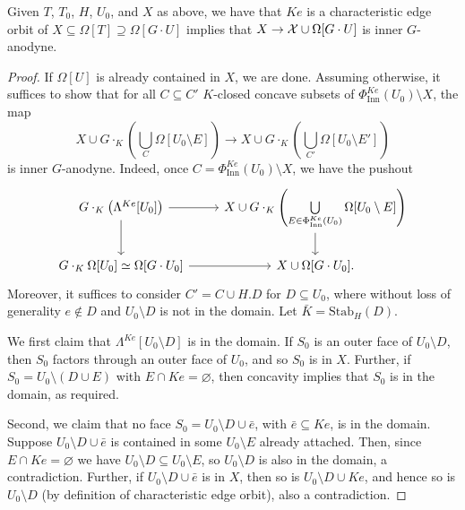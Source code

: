 \documentclass[a4paper,10pt,draft]{article}%
\numberwithin{equation}{section}%
\begin{document}
\begin{proposition}
      \label{CHAR_HORN_PROP}
      Given $T$, $T_0$, $H$, $U_0$, and $X$ as above, we have that
      $K e$ is a characteristic edge orbit of $X \subseteq \Omega[T] \supseteq \Omega[G \cdot U]$
      implies that $X \to \mathcal{X} \cup \Omega[G \cdot U]$ is inner $G$-anodyne.
\end{proposition}
\begin{proof}
      If $\Omega[U]$ is already contained in $X$, we are done.
      Assuming otherwise, it suffices to show that for all
      $C \subseteq C'$ $K$-closed concave subsets of $\Phi_{\mathrm{Inn}}^{K e}(U_0) \setminus X$, the map
      \begin{equation}
            X \cup G \cdot_K \left( \bigcup\limits_{C}\Omega[U_0 \setminus E] \right)
            \to
            X \cup G \cdot_K \left( \bigcup\limits_{C'}\Omega[U_0 \setminus E'] \right)                     
      \end{equation}
      is inner $G$-anodyne.
      Indeed, once $C = \Phi_{\mathrm{Inn}}^{K e}(U_0) \setminus X$, we have the pushout
      \begin{equation}
            \begin{tikzcd}
                  G \cdot_K \left( \Lambda^{K e}[U_0] \right) \arrow[d] \arrow[r]
                  &
                  X \cup G \cdot_K \left( \bigcup\limits_{E \in \Phi_{\mathrm{Inn}}^{K e}(U_0)} \Omega[U_0 \setminus E] \arrow[d] \right)
                  \\
                  G \cdot_K \Omega[U_0] \simeq \Omega[G \cdot U_0] \arrow[r]
                  &
                  X \cup \Omega[G \cdot U_0].
            \end{tikzcd}
      \end{equation}
      Moreover, it suffices to consider $C' = C \cup H.D$ for $D \subseteq U_0$, where
      without loss of generality $e \not\in D$ and $U_0 \setminus D$ is not in the domain.
      Let $\bar K = \mathrm{Stab}_H(D)$.

      We first claim that $\Lambda^{K e}[U_0 \setminus D]$ is in the domain.
      If $S_0$ is an outer face of $U_0 \setminus D$, then
      $S_0$ factors through an outer face of $U_0$, and so $S_0$ is in $X$.
      Further, if $S_0 = U_0 \setminus (D \cup E)$ with $E \cap K e = \varnothing$,
      then concavity implies that $S_0$ is in the domain, as required.

      Second, we claim that no face $S_0 = U_0 \setminus D \cup \bar e$, with $\bar e \subseteq K e$, is in the domain.
      Suppose $U_0 \setminus D \cup \bar e$ is contained in some $U_0 \setminus E$ already attached.
      Then, since $E \cap K e = \varnothing$ we have $U_0 \setminus D \subseteq U_0 \setminus E$, so
      $U_0 \setminus D$ is also in the domain, a contradiction.
      Further, if $U_0 \setminus D \cup \bar e$ is in $X$, then so is $U_0 \setminus D \cup K e$, and hence
      so is $U_0 \setminus D$ (by definition of characteristic edge orbit), also a contradiction.


\end{proof}
\end{document}
